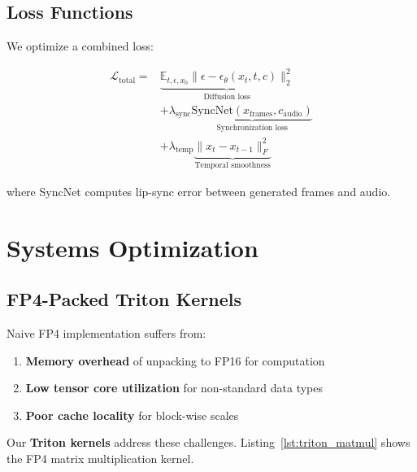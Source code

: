 \documentclass[journal]{IEEEtran}
\theoremstyle{definition}
\theoremstyle{remark}
\newcommand{\EE}{\mathbb{E}}
\begin{document}
\subsection{Loss Functions}

We optimize a combined loss:

\begin{equation}
\begin{split}
\mathcal{L}_{\text{total}} = &\underbrace{\EE_{t, \epsilon, x_0} \| \epsilon - \epsilon_\theta(x_t, t, c) \|_2^2}_{\text{Diffusion loss}} \\
&+ \lambda_{\text{sync}} \underbrace{\text{SyncNet}(x_{\text{frames}}, c_{\text{audio}})}_{\text{Synchronization loss}} \\
&+ \lambda_{\text{temp}} \underbrace{\|x_{t} - x_{t-1}\|_F^2}_{\text{Temporal smoothness}}
\end{split}
\end{equation}

where SyncNet \cite{chung2019syncnet} computes lip-sync error between generated frames and audio.

\section{Systems Optimization}
\label{sec:systems}

\subsection{FP4-Packed Triton Kernels}

Naive FP4 implementation suffers from:
\begin{enumerate}
    \item \textbf{Memory overhead} of unpacking to FP16 for computation
    \item \textbf{Low tensor core utilization} for non-standard data types
    \item \textbf{Poor cache locality} for block-wise scales
\end{enumerate}

Our \textbf{Triton kernels} address these challenges. Listing~\ref{lst:triton_matmul} shows the FP4 matrix multiplication kernel.
\end{document}
